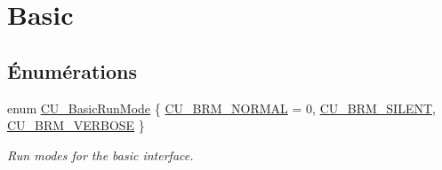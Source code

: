 \hypertarget{group__Basic}{\section{Basic}
\label{group__Basic}
}
\subsection*{Énumérations}
\begin{DoxyCompactItemize}
\item 
enum \hyperlink{group__Basic_ga2f7ec57f8b59cfef5c5600bafa4865a6}{C\-U\-\_\-\-Basic\-Run\-Mode} \{ \hyperlink{group__Basic_gga2f7ec57f8b59cfef5c5600bafa4865a6a9ef29da018d441e7c8e58b9a1676573b}{C\-U\-\_\-\-B\-R\-M\-\_\-\-N\-O\-R\-M\-A\-L} =  0, 
\hyperlink{group__Basic_gga2f7ec57f8b59cfef5c5600bafa4865a6aa7f2cb5a71733216814b6e3d61dcb24e}{C\-U\-\_\-\-B\-R\-M\-\_\-\-S\-I\-L\-E\-N\-T}, 
\hyperlink{group__Basic_gga2f7ec57f8b59cfef5c5600bafa4865a6a7ce505dc562e2fbf20505059114afea9}{C\-U\-\_\-\-B\-R\-M\-\_\-\-V\-E\-R\-B\-O\-S\-E}
 \}
\begin{DoxyCompactList}\small\item\em Run modes for the basic interface. \end{DoxyCompactList}\end{DoxyCompactItemize}
